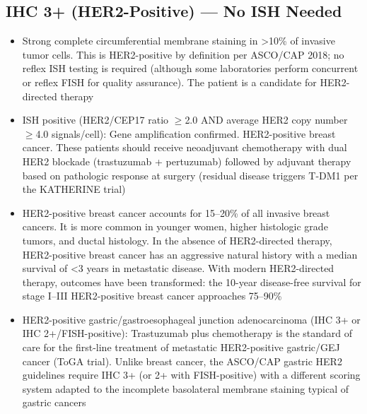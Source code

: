 \subsection*{IHC 3+ (HER2-Positive) --- No ISH Needed}
\begin{itemize}
  \item Strong complete circumferential membrane staining in >10\% of invasive tumor cells. This is HER2-positive by definition per ASCO/CAP 2018; no reflex ISH testing is required (although some laboratories perform concurrent or reflex FISH for quality assurance). The patient is a candidate for HER2-directed therapy
  \item ISH positive (HER2/CEP17 ratio $\geq$2.0 AND average HER2 copy number $\geq$4.0 signals/cell): Gene amplification confirmed. HER2-positive breast cancer. These patients should receive neoadjuvant chemotherapy with dual HER2 blockade (trastuzumab + pertuzumab) followed by adjuvant therapy based on pathologic response at surgery (residual disease triggers T-DM1 per the KATHERINE trial)
  \item HER2-positive breast cancer accounts for 15--20\% of all invasive breast cancers. It is more common in younger women, higher histologic grade tumors, and ductal histology. In the absence of HER2-directed therapy, HER2-positive breast cancer has an aggressive natural history with a median survival of <3 years in metastatic disease. With modern HER2-directed therapy, outcomes have been transformed: the 10-year disease-free survival for stage I--III HER2-positive breast cancer approaches 75--90\%
  \item HER2-positive gastric/gastroesophageal junction adenocarcinoma (IHC 3+ or IHC 2+/FISH-positive): Trastuzumab plus chemotherapy is the standard of care for the first-line treatment of metastatic HER2-positive gastric/GEJ cancer (ToGA trial). Unlike breast cancer, the ASCO/CAP gastric HER2 guidelines require IHC 3+ (or 2+ with FISH-positive) with a different scoring system adapted to the incomplete basolateral membrane staining typical of gastric cancers
\end{itemize}

